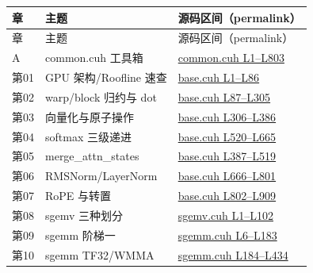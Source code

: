 \begin{longtable}{llp{7.2cm}}
\toprule
章 & 主题 & 源码区间（permalink） \\
\midrule
\endfirsthead
\toprule
章 & 主题 & 源码区间（permalink） \\
\midrule
\endhead
A & common.cuh 工具箱 & \href{https://github.com/xlite-dev/LeetCUDA/blob/6cd32deca683d6c4aae2011988c9f4a35bc5f528/kernels/interview/common.cuh#L1-L803}{common.cuh L1--L803} \\
第01 & GPU 架构/Roofline 速查 & \href{https://github.com/xlite-dev/LeetCUDA/blob/6cd32deca683d6c4aae2011988c9f4a35bc5f528/kernels/interview/base.cuh#L1-L86}{base.cuh L1--L86} \\
第02 & warp/block 归约与 dot & \href{https://github.com/xlite-dev/LeetCUDA/blob/6cd32deca683d6c4aae2011988c9f4a35bc5f528/kernels/interview/base.cuh#L87-L305}{base.cuh L87--L305} \\
第03 & 向量化与原子操作 & \href{https://github.com/xlite-dev/LeetCUDA/blob/6cd32deca683d6c4aae2011988c9f4a35bc5f528/kernels/interview/base.cuh#L306-L386}{base.cuh L306--L386} \\
第04 & softmax 三级递进 & \href{https://github.com/xlite-dev/LeetCUDA/blob/6cd32deca683d6c4aae2011988c9f4a35bc5f528/kernels/interview/base.cuh#L520-L665}{base.cuh L520--L665} \\
第05 & merge\_attn\_states & \href{https://github.com/xlite-dev/LeetCUDA/blob/6cd32deca683d6c4aae2011988c9f4a35bc5f528/kernels/interview/base.cuh#L387-L519}{base.cuh L387--L519} \\
第06 & RMSNorm/LayerNorm & \href{https://github.com/xlite-dev/LeetCUDA/blob/6cd32deca683d6c4aae2011988c9f4a35bc5f528/kernels/interview/base.cuh#L666-L801}{base.cuh L666--L801} \\
第07 & RoPE 与转置 & \href{https://github.com/xlite-dev/LeetCUDA/blob/6cd32deca683d6c4aae2011988c9f4a35bc5f528/kernels/interview/base.cuh#L802-L909}{base.cuh L802--L909} \\
第08 & sgemv 三种划分 & \href{https://github.com/xlite-dev/LeetCUDA/blob/6cd32deca683d6c4aae2011988c9f4a35bc5f528/kernels/interview/sgemv.cuh#L1-L102}{sgemv.cuh L1--L102} \\
第09 & sgemm 阶梯一 & \href{https://github.com/xlite-dev/LeetCUDA/blob/6cd32deca683d6c4aae2011988c9f4a35bc5f528/kernels/interview/sgemm.cuh#L6-L183}{sgemm.cuh L6--L183} \\
第10 & sgemm TF32/WMMA & \href{https://github.com/xlite-dev/LeetCUDA/blob/6cd32deca683d6c4aae2011988c9f4a35bc5f528/kernels/interview/sgemm.cuh#L184-L434}{sgemm.cuh L184--L434} \\

\end{longtable}
